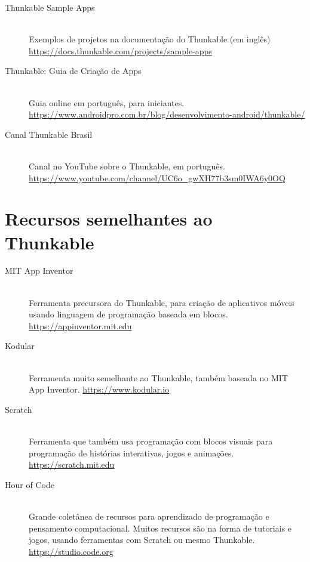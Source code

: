 \documentclass[11pt,fleqn]{book} %
\begin{document}
\begin{description}
    \item[Thunkable Sample Apps] ~\\
    Exemplos de projetos na documentação do Thunkable (em inglês)\\
    \url{https://docs.thunkable.com/projects/sample-apps}
    
    \item[Thunkable: Guia de Criação de Apps] ~\\
    Guia online em português, para iniciantes.\\
    \url{https://www.androidpro.com.br/blog/desenvolvimento-android/thunkable/}
    
    \item[Canal Thunkable Brasil] ~\\
    Canal no YouTube sobre o Thunkable, em português.
    \url{https://www.youtube.com/channel/UC6o_gwXH77b3sm0IWA6y0OQ}
    
    
\end{description}

\section{Recursos semelhantes ao Thunkable}

\begin{description}
    \item[MIT App Inventor] ~\\
    Ferramenta precursora do Thunkable, para criação de aplicativos móveis usando linguagem de programação baseada em blocos.\\
    \url{https://appinventor.mit.edu}
    
    \item[Kodular] ~\\
    Ferramenta muito semelhante ao Thunkable, também baseada no MIT App Inventor. 
    \url{https://www.kodular.io}
    
    \item[Scratch] ~\\
    Ferramenta que também usa programação com blocos visuais para programação de histórias interativas, jogos e animações.\\
    \url{https://scratch.mit.edu} 
    
    \item[Hour of Code] ~\\
    Grande coletânea de recursos para aprendizado de programação e pensamento computacional. Muitos recursos são na forma de tutoriais e jogos, usando ferramentas com Scratch ou mesmo Thunkable.\\
    \url{https://studio.code.org} 
	
	
\end{description}
\end{document}
